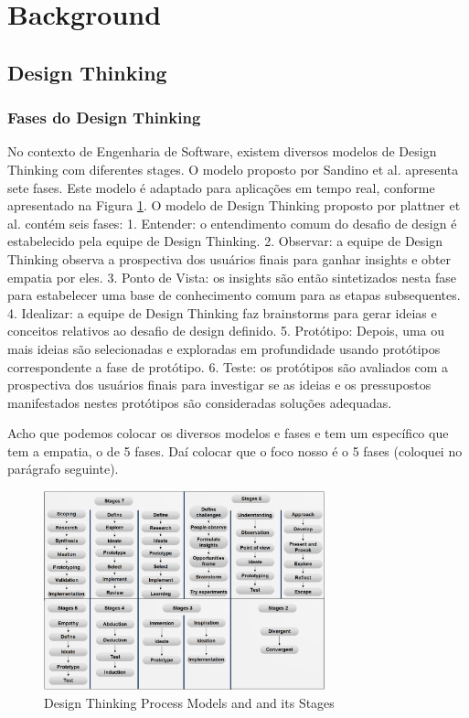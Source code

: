 \documentclass[conference]{IEEEtran}
\begin{document}
\section{Background}
\label{back}

\subsection{Design Thinking}

\subsubsection{Fases do Design Thinking}

No contexto de Engenharia de Software, existem diversos modelos de Design Thinking com diferentes stages. O modelo proposto por Sandino et al. \cite{DBLP:conf/hci/SandinoMV13} apresenta sete fases. Este modelo é adaptado para aplicações em tempo real, conforme apresentado na Figura \ref{fig:my_label}. O modelo
de Design Thinking proposto por plattner et al. \cite{plattner2009design} contém seis fases: 1. Entender: o entendimento comum do desafio de design é estabelecido pela equipe de Design Thinking. 2. Observar: a equipe de Design Thinking observa a prospectiva dos usuários finais para ganhar insights e obter empatia por eles. 3. Ponto de Vista: os insights são então sintetizados nesta fase para estabelecer uma base de conhecimento comum para as etapas
subsequentes. 4. Idealizar: a equipe de Design Thinking faz brainstorms para gerar ideias e conceitos relativos ao desafio de design definido. 5. Protótipo: Depois, uma ou mais ideias são selecionadas e exploradas em profundidade usando protótipos correspondente a fase de protótipo. 6. Teste: os protótipos são avaliados com a prospectiva dos usuários finais para investigar se as ideias e os pressupostos manifestados nestes protótipos são consideradas soluções adequadas.


Acho que podemos colocar os diversos modelos e fases e tem um específico que tem a empatia, o de 5 fases. Daí colocar que o foco nosso é o 5 fases (coloquei no parágrafo seguinte).

\begin{figure}
    \centering
    \includegraphics[width=3.2in]{Figures/ModelStages.png}    \caption{Design Thinking Process Models and and its Stages \cite{DBLP:conf/hci/CanedoC18}}
    \label{fig:my_label}
\end{figure}
\end{document}
